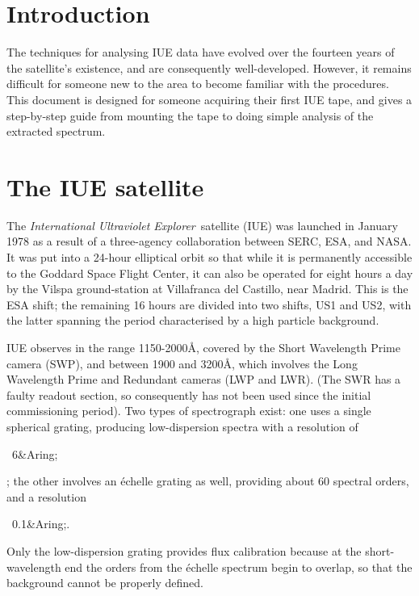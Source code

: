 \begin{latexonly}
   \setlength{\parskip}{0mm}
   \latexonlytoc
   \setlength{\parskip}{\medskipamount}
   \markright{\stardocname}
\end{latexonly}

\newpage

\section{Introduction}

The techniques for analysing IUE data have evolved over the fourteen
years of the satellite's existence, and are consequently well-developed.
However, it remains difficult for someone new to the area to become familiar
with the procedures. This document is designed for someone acquiring their
first IUE tape, and gives a step-by-step guide from mounting the tape to
doing simple analysis of the extracted spectrum.

\section{The IUE satellite}

The {\it International Ultraviolet Explorer}\, satellite (IUE) was launched in
January 1978 as a result of a three-agency collaboration between SERC, ESA,
and NASA\@. It was put into a 24-hour elliptical orbit so that while it is
permanently accessible to the Goddard Space Flight Center, it can also be
operated for eight hours a day by the Vilspa ground-station at Villafranca
del Castillo, near Madrid. This is the ESA shift; the remaining 16 hours are
divided into two shifts, US1 and US2, with the latter spanning the period
characterised by a high particle background.

\begin{htmlonly}
IUE observes in the range 1150-2000{\AA}, covered by the Short Wavelength Prime
camera (SWP), and between 1900 and 3200{\AA}, which involves the Long
Wavelength Prime and Redundant cameras (LWP and LWR). (The SWR has a faulty
readout section, so consequently has not been used since the initial
commissioning period). Two types of spectrograph exist: one uses a single
spherical grating, producing low-dispersion spectra with a resolution of
\begin{rawhtml}~6&Aring;\end{rawhtml}
; the other involves an \'{e}chelle grating as well, providing about
60 spectral orders, and a resolution
\begin{rawhtml}~0.1&Aring;.\end{rawhtml}
Only the low-dispersion grating provides flux calibration because at the
short-wavelength end the orders from the \'{e}chelle spectrum begin to overlap,
so that the background cannot be properly defined.
\end{htmlonly}

